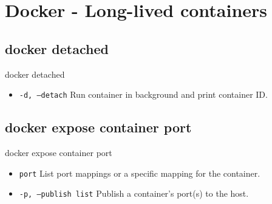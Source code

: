 
\section{Docker - Long-lived containers}\label{sec:docker-long-lived-containers}

\subsection{docker detached}\label{subsec:docker-detached}
\begin{frame}{docker detached}
    \begin{itemize}
        \item \texttt{-d, --detach} Run container in background and print container ID.
        
    \end{itemize}
\end{frame}

\subsection{docker expose container port}\label{subsec:docker-expose-container-port}
\begin{frame}{docker expose container port}
    \begin{itemize}
        \item \texttt{port} List port mappings or a specific mapping for the container.
        \item \texttt{-p, --publish list} Publish a container's port(s) to the host.
        
    \end{itemize}
\end{frame}

